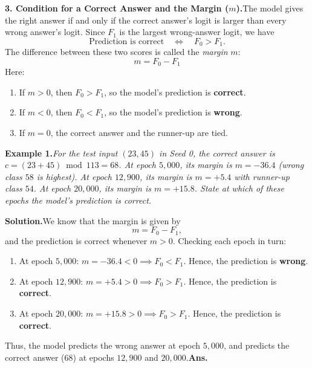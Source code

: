 \documentclass[11pt,a4paper,oneside]{report}
\newcommand{\Fzero}{F_{0}}
\newcommand{\Fone}{F_{1}}
\newcommand{\Ans}{\hfill\textbf{Ans.}}
\begin{document}
\medskip
\noindent\textbf{3. Condition for a Correct Answer and the Margin ($m$).}\quad The model gives the right answer if and only if the correct answer's logit is larger than every wrong answer's logit. Since $\Fone$ is the largest wrong-answer logit, we have
\begin{equation}
\text{Prediction is correct} \quad \Longleftrightarrow \quad \Fzero > \Fone.
\end{equation}
The difference between these two scores is called the \emph{margin} $m$:
\begin{equation}
\boxed{m = \Fzero - \Fone}
\end{equation}
Here:
\begin{enumerate}[label=\textbf{(\roman*)}]
\item If $m > 0$, then $\Fzero > \Fone$, so the model's prediction is \textbf{correct}.
\item If $m < 0$, then $\Fzero < \Fone$, so the model's prediction is \textbf{wrong}.
\item If $m = 0$, the correct answer and the runner-up are tied.
\end{enumerate}

\medskip
\noindent\textbf{Example 1.}\quad \textit{For the test input $(23, 45)$ in Seed 0, the correct answer is $c = (23 + 45) \bmod 113 = 68$. At epoch $5{,}000$, its margin is $m = -36.4$ (wrong class $58$ is highest). At epoch $12{,}900$, its margin is $m = +5.4$ with runner-up class $54$. At epoch $20{,}000$, its margin is $m = +15.8$. State at which of these epochs the model's prediction is correct.}

\smallskip
\noindent\textbf{Solution.}\quad We know that the margin is given by
\[
m = \Fzero - \Fone,
\]
and the prediction is correct whenever $m > 0$. Checking each epoch in turn:
\begin{enumerate}[label=\textbf{(\roman*)}]
\item At epoch $5{,}000$: $m = -36.4 < 0 \implies \Fzero < \Fone$. Hence, the prediction is \textbf{wrong}.
\item At epoch $12{,}900$: $m = +5.4 > 0 \implies \Fzero > \Fone$. Hence, the prediction is \textbf{correct}.
\item At epoch $20{,}000$: $m = +15.8 > 0 \implies \Fzero > \Fone$. Hence, the prediction is \textbf{correct}.
\end{enumerate}
Thus, the model predicts the wrong answer at epoch $5{,}000$, and predicts the correct answer ($68$) at epochs $12{,}900$ and $20{,}000$.\Ans
\end{document}
